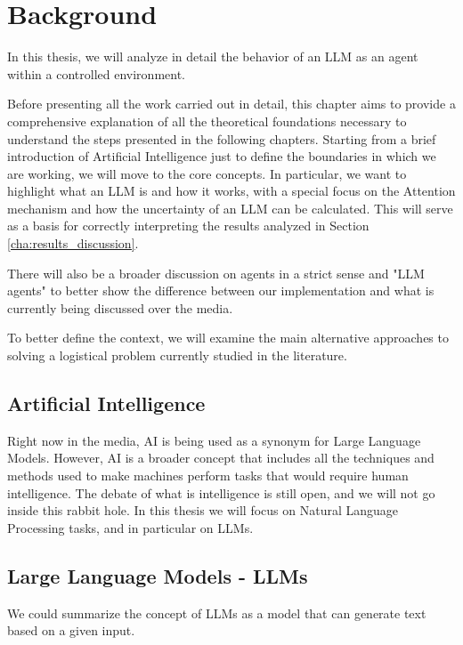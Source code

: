 \chapter{Background}
\label{cha:background}

In this thesis, we will analyze in detail the behavior of an LLM as an agent within
a controlled environment.

Before presenting all the work carried out in detail, this chapter aims to
provide a comprehensive explanation of all the theoretical foundations necessary
to understand the steps presented in the following chapters. Starting from a brief
introduction of Artificial Intelligence just to define the boundaries in which we
are working, we will move to the core concepts. In particular, we want to
highlight what an LLM is and how it works, with a special focus on the Attention
mechanism and how the uncertainty of an LLM can be calculated. This will serve
as a basis for correctly interpreting the results analyzed in Section
\ref{cha:results_discussion}.

There will also be a broader discussion on agents in a strict sense and "LLM agents"
to better show the difference between our implementation and what is currently
being discussed over the media.

To better define the context, we will examine the main alternative approaches to
solving a logistical problem currently studied in the literature.

\section{Artificial Intelligence}
\label{sec:artificial_intelligence} Right now in the media, AI is being used as
a synonym for Large Language Models. However, AI is a broader concept that
includes all the techniques and methods used to make machines perform tasks that
would require human intelligence. The debate of what is intelligence is still open,
and we will not go inside this rabbit hole. In this thesis we will focus on Natural
Language Processing tasks, and in particular on LLMs.

\section{Large Language Models - LLMs}
\label{sec:large_language_models_llms}

We could summarize the concept of LLMs as a model that can generate text based on
a given input.

